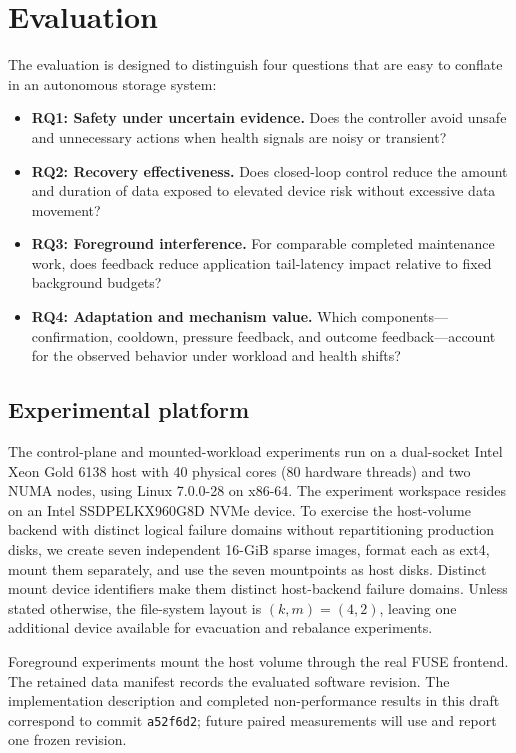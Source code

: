 \section{Evaluation}
\label{sec:evaluation}

The evaluation is designed to distinguish four questions that are easy to conflate in an autonomous storage system:
\begin{itemize}[leftmargin=*]
  \item \textbf{RQ1: Safety under uncertain evidence.} Does the controller avoid unsafe and unnecessary actions when health signals are noisy or transient?
  \item \textbf{RQ2: Recovery effectiveness.} Does closed-loop control reduce the amount and duration of data exposed to elevated device risk without excessive data movement?
  \item \textbf{RQ3: Foreground interference.} For comparable completed maintenance work, does feedback reduce application tail-latency impact relative to fixed background budgets?
  \item \textbf{RQ4: Adaptation and mechanism value.} Which components---confirmation, cooldown, pressure feedback, and outcome feedback---account for the observed behavior under workload and health shifts?
\end{itemize}

\subsection{Experimental platform}
The control-plane and mounted-workload experiments run on a dual-socket Intel Xeon Gold 6138 host with 40 physical cores (80 hardware threads) and two NUMA nodes, using Linux 7.0.0-28 on x86-64. The experiment workspace resides on an Intel SSDPELKX960G8D NVMe device. To exercise the host-volume backend with distinct logical failure domains without repartitioning production disks, we create seven independent 16-GiB sparse images, format each as ext4, mount them separately, and use the seven mountpoints as \argosfs{} host disks. Distinct mount device identifiers make them distinct host-backend failure domains. Unless stated otherwise, the file-system layout is $(k,m)=(4,2)$, leaving one additional device available for evacuation and rebalance experiments.

Foreground experiments mount the host volume through the real \argosfs{} FUSE frontend. The retained data manifest records the evaluated software revision. The implementation description and completed non-performance results in this draft correspond to \argosfs{} commit \texttt{a52f6d2}; future paired measurements will use and report one frozen revision.

